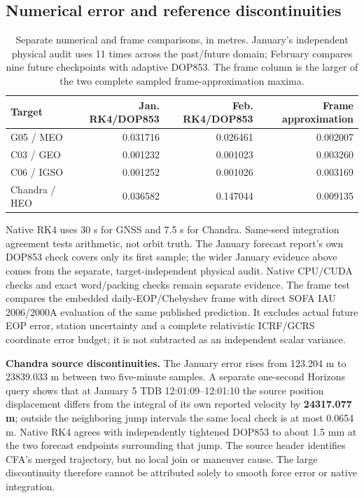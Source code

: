 \subsection{Numerical error and reference discontinuities}
\label{sec:orbit-error-separation}
\begin{table}[htbp]
\centering\small
\caption{Separate numerical and frame comparisons, in metres. January's
independent physical audit uses 11 times across the past/future domain;
February compares nine future checkpoints with adaptive DOP853. The frame
column is the larger of the two complete sampled frame-approximation maxima.}
\label{tab:orbit-error-components}
\begin{tabular*}{\linewidth}{@{\extracolsep{\fill}}lrrr@{}}
\toprule
Target & Jan. RK4/DOP853 & Feb. RK4/DOP853 & Frame approximation\\
\midrule
G05 / MEO & 0.031716 & 0.026461 & 0.002007\\
C03 / GEO & 0.001232 & 0.001023 & 0.003260\\
C06 / IGSO & 0.001252 & 0.001026 & 0.003169\\
Chandra / HEO & 0.036582 & 0.147044 & 0.009135\\
\bottomrule
\end{tabular*}
\end{table}

Native RK4 uses 30 s for GNSS and 7.5 s for Chandra. Same-seed integration
agreement tests arithmetic, not orbit truth. The January forecast report's
own DOP853 check covers only its first sample; the wider January evidence above
comes from the separate, target-independent physical audit. Native CPU/CUDA
checks and exact word/packing checks remain separate evidence.
The frame test compares the embedded daily-EOP/Chebyshev frame with direct SOFA
IAU 2006/2000A evaluation of the same published prediction. It excludes actual
future EOP error, station uncertainty and a complete relativistic ICRF/GCRS
coordinate error budget; it is not subtracted as an independent scalar variance.

\begingroup{}
\textbf{Chandra source discontinuities.} The January error rises from
123.204 m to 23839.033 m between two five-minute samples. A separate one-second
Horizons query shows that at January 5 TDB 12:01:09--12:01:10 the source
position displacement differs from the integral of its own reported velocity
by \textbf{24317.077 m}; outside the neighboring jump intervals the same local
check is at most 0.0654 m. Native RK4 agrees with independently tightened
DOP853 to about 1.5 mm at the two forecast endpoints surrounding that jump.
The source header identifies CFA's merged trajectory, but no local join or
maneuver cause. The large discontinuity therefore cannot be attributed solely
to smooth force error or native integration.
\par\endgroup

